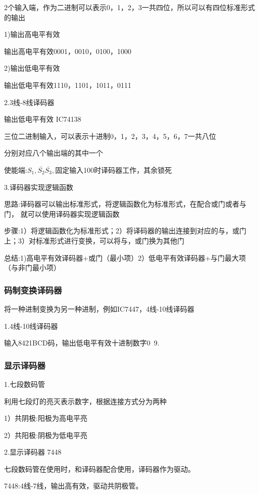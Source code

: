 \documentclass[11pt,twoside,a4paper]{ctexart}
\begin{document}
    2个输入端，作为二进制可以表示0，1，2，3一共四位，所以可以有四位标准形式的输出

    1)输出高电平有效

    输出高电平有效0001，0010，0100，1000

    2)输出低电平有效

    输出低电平有效1110，1101，1011，0111

    2.3线-8线译码器

    输出低电平有效 IC74138

    三位二进制输入，可以表示十进制0，1，2，3，4，5，6，7一共八位

    分别对应八个输出端的其中一个

    使能端:$S_1,\overline{S_2}\overline{S_3},$固定输入100时译码器工作，其余锁死

    3.译码器实现逻辑函数

    思路:译码器可以输出标准形式，将逻辑函数化为标准形式，在配合或门或者与门，
    就可以使用译码器实现逻辑函数

    步骤:1）将逻辑函数化为标准形式；2）将译码器的输出连接到对应的与，或门上；3）对标准形式进行变换，可以将与，或门换为其他门

    总结:1)高电平有效译码器+或门（最小项）2）低电平有效译码器+与门最大项（与非门最小项）

    \subsubsection{码制变换译码器}

    将一种进制变换为另一种进制，例如IC7447，4线-10线译码器

    1.4线-10线译码器

    输入8421BCD码，输出低电平有效十进制数字0~9.

    \subsubsection{显示译码器}

    1.七段数码管

    利用七段灯的亮灭表示数字，根据连接方式分为两种

    1）共阴极:阳极为高电平亮

    2）共阳极:阴极为低电平亮

    2.显示译码器 7448
    
    七段数码管在使用时，和译码器配合使用，译码器作为驱动。

    7448:4线-7线，输出高有效，驱动共阴极管。
\end{document}
